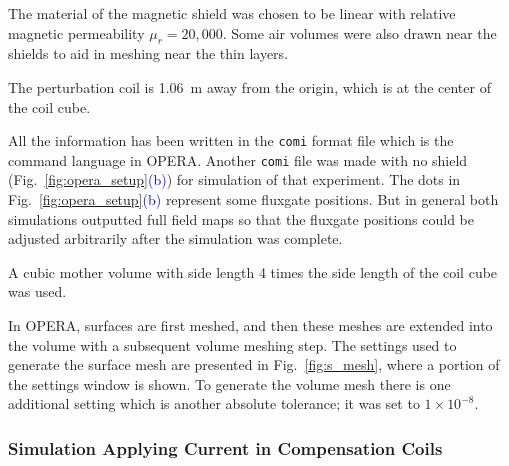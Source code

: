 The material of the magnetic shield was chosen to be linear with
relative magnetic permeability $\mu_r=20,000$.  Some air volumes were
also drawn near the shields to aid in meshing near the thin layers.

The perturbation coil is 1.06~m away from the origin, which is at the
center of the coil cube.

All the information has been written in the {\tt comi} format
file which is the command language in OPERA. Another {\tt comi} file
was made with no shield
(Fig.~\ref{fig:opera_setup}\textcolor{blue}{(b)}) for simulation of
that experiment.  The dots in
Fig.~\ref{fig:opera_setup}\textcolor{blue}{(b)} represent some
fluxgate positions.  But in general both simulations outputted full
field maps so that the fluxgate positions could be adjusted
arbitrarily after the simulation was complete.

A cubic mother volume with side length 4 times the side length of the
coil cube was used.



In OPERA, surfaces are first meshed, and then these meshes are
extended into the volume with a subsequent volume meshing step.
The settings used to generate the surface mesh are presented in
Fig.~\ref{fig:s_mesh}, where a portion of the settings window is
shown.  To generate the volume mesh there is one additional setting
which is another absolute tolerance; it was set to $1\times10^{-8}$.

\subsubsection{Simulation Applying Current in Compensation Coils}\label{sec:mSim}



